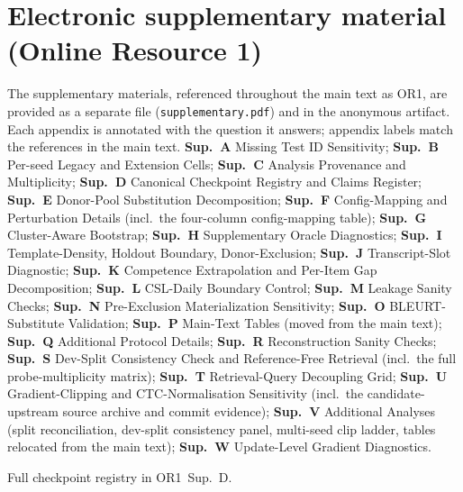 \documentclass[pdflatex,sn-chicago]{sn-jnl}
\begin{document}
\section*{Electronic supplementary material (Online Resource 1)}
The supplementary materials, referenced throughout the main text as OR1, are provided as a separate file (\texttt{supplementary.pdf}) and in the anonymous artifact. Each appendix is annotated with the question it answers; appendix labels match the references in the main text.
\footnotesize \textbf{Sup.~A} Missing Test ID Sensitivity; \textbf{Sup.~B} Per-seed Legacy and Extension Cells; \textbf{Sup.~C} Analysis Provenance and Multiplicity; \textbf{Sup.~D} Canonical Checkpoint Registry and Claims Register; \textbf{Sup.~E} Donor-Pool Substitution Decomposition; \textbf{Sup.~F} Config-Mapping and Perturbation Details (incl.\ the four-column config-mapping table); \textbf{Sup.~G} Cluster-Aware Bootstrap; \textbf{Sup.~H} Supplementary Oracle Diagnostics; \textbf{Sup.~I} Template-Density, Holdout Boundary, Donor-Exclusion; \textbf{Sup.~J} Transcript-Slot Diagnostic; \textbf{Sup.~K} Competence Extrapolation and Per-Item Gap Decomposition; \textbf{Sup.~L} CSL-Daily Boundary Control; \textbf{Sup.~M} Leakage Sanity Checks; \textbf{Sup.~N} Pre-Exclusion Materialization Sensitivity; \textbf{Sup.~O} BLEURT-Substitute Validation; \textbf{Sup.~P} Main-Text Tables (moved from the main text); \textbf{Sup.~Q} Additional Protocol Details; \textbf{Sup.~R} Reconstruction Sanity Checks; \textbf{Sup.~S} Dev-Split Consistency Check and Reference-Free Retrieval (incl.\ the full probe-multiplicity matrix); \textbf{Sup.~T} Retrieval-Query Decoupling Grid; \textbf{Sup.~U} Gradient-Clipping and CTC-Normalisation Sensitivity (incl.\ the candidate-upstream source archive and commit evidence); \textbf{Sup.~V} Additional Analyses (split reconciliation, dev-split consistency panel, multi-seed clip ladder, tables relocated from the main text); \textbf{Sup.~W} Update-Level Gradient Diagnostics.

Full checkpoint registry in OR1~Sup.~D.


\end{document}
